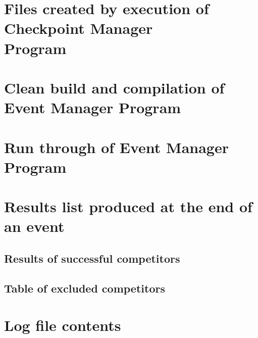 \documentclass[a4paper,12pt]{article}
\begin{document}
\newpage

\section{Files created by execution of Checkpoint Manager\\Program}


\newpage

\section{Clean build and compilation of Event Manager Program}


\begin{landscape}
\section{Run through of Event Manager Program}


\newpage

\section{Results list produced at the end of an event}

\subsection{Results of successful competitors}


\subsection{Table of excluded competitors}


\section{Log file contents}


\end{landscape}
\end{document}
